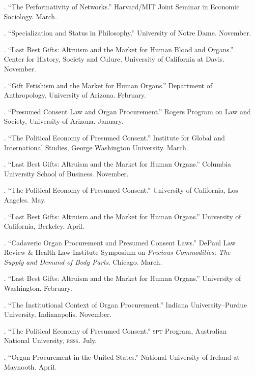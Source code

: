 \documentclass[11pt]{article}
\begin{document}
. ``The Performativity of Networks.'' Harvard/MIT Joint Seminar in Economic Sociology. March.

. ``Specialization and Status in Philosophy.'' University of Notre Dame. November. 

. ``Last Best Gifts: Altruism and the Market for Human Blood and Organs.'' Center for History, Society and Culure, University of California at Davis. November.

. ``Gift Fetishism and the Market for Human Organs.'' Department of Anthropology, University of Arizona. February. 

. ``Presumed Consent Law and Organ Procurement.'' Rogers Program on Law and Society, University of Arizona. January. 

. ``The Political Economy of Presumed Consent.'' Institute for Global
and International Studies, George Washington University. March.

. ``Last Best Gifts: Altruism and the Market for Human Organs.''
Columbia University School of Business. November. 

. ``The Political Economy of Presumed Consent.'' University of California, Los Angeles. May.

. ``Last Best Gifts: Altruism and the Market for Human Organs.''
University of California, Berkeley. April.

. ``Cadaveric Organ Procurement and Presumed Consent Laws.'' DePaul
Law Review \& Health Law Institute Symposium on \emph{Precious Commodities: The
Supply and Demand of Body Parts}. Chicago. March. 

. ``Last Best Gifts: Altruism and the Market for Human 
Organs.'' University of Washington. February. 

. ``The Institutional Context of Organ Procurement.'' Indiana
University--Purdue University, Indianapolis. November.

. ``The Political Economy of Presumed Consent.'' \textsc{spt} Program,
Australian National University, \textsc{rsss}. July. 

. ``Organ Procurement in the United States.'' National University of
Ireland at Maynooth. April. 



\bigskip


\medskip
\end{document}
